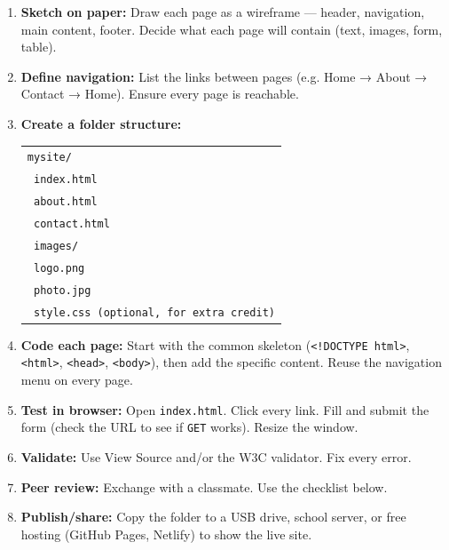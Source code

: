 \documentclass[11pt]{article}
\begin{document}
\begin{methode}
\begin{enumerate}
  \item \textbf{Sketch on paper:} Draw each page as a wireframe — header, navigation, main content, footer.  Decide what each page will contain (text, images, form, table).
  \item \textbf{Define navigation:} List the links between pages (e.g. Home → About → Contact → Home).  Ensure every page is reachable.
  \item \textbf{Create a folder structure:}
  \begin{tabular}{@{}l@{}}
  \texttt{mysite/} \\
  \texttt{  index.html} \\
  \texttt{  about.html} \\
  \texttt{  contact.html} \\
  \texttt{  images/} \\
  \texttt{    logo.png} \\
  \texttt{    photo.jpg} \\
  \texttt{  style.css   (optional, for extra credit)}
  \end{tabular}
  \item \textbf{Code each page:} Start with the common skeleton (\texttt{<!DOCTYPE html>}, \texttt{<html>}, \texttt{<head>}, \texttt{<body>}), then add the specific content.  Reuse the navigation menu on every page.
  \item \textbf{Test in browser:} Open \texttt{index.html}.  Click every link.  Fill and submit the form (check the URL to see if \texttt{GET} works).  Resize the window.
  \item \textbf{Validate:} Use View Source and/or the W3C validator.  Fix every error.
  \item \textbf{Peer review:} Exchange with a classmate.  Use the checklist below.
  \item \textbf{Publish/share:} Copy the folder to a USB drive, school server, or free hosting (GitHub Pages, Netlify) to show the live site.
\end{enumerate}
\end{methode}
\end{document}
